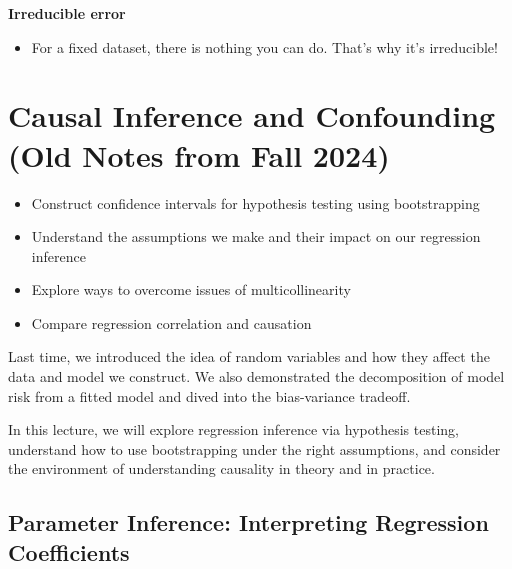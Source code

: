\documentclass[
  letterpaper,
  DIV=11,
  numbers=noendperiod]{scrreprt}
\providecommand{\tightlist}{%
  \setlength{\itemsep}{0pt}\setlength{\parskip}{0pt}}\usepackage{longtable,booktabs,array}
\begin{document}
\textbf{Irreducible error}

\begin{itemize}
\tightlist
\item
  For a fixed dataset, there is nothing you can do. That's why it's
  irreducible!
\end{itemize}


\chapter{Causal Inference and Confounding (Old Notes from Fall
2024)}\label{causal-inference-and-confounding-old-notes-from-fall-2024}

\begin{tcolorbox}[enhanced jigsaw, titlerule=0mm, bottomtitle=1mm, arc=.35mm, colframe=quarto-callout-note-color-frame, rightrule=.15mm, opacityback=0, opacitybacktitle=0.6, leftrule=.75mm, breakable, toprule=.15mm, colback=white, left=2mm, colbacktitle=quarto-callout-note-color!10!white, toptitle=1mm, bottomrule=.15mm, title=\textcolor{quarto-callout-note-color}{\faInfo}\hspace{0.5em}{Learning Outcomes}, coltitle=black]

\begin{itemize}
\tightlist
\item
  Construct confidence intervals for hypothesis testing using
  bootstrapping
\item
  Understand the assumptions we make and their impact on our regression
  inference
\item
  Explore ways to overcome issues of multicollinearity
\item
  Compare regression correlation and causation
\end{itemize}

\end{tcolorbox}

Last time, we introduced the idea of random variables and how they
affect the data and model we construct. We also demonstrated the
decomposition of model risk from a fitted model and dived into the
bias-variance tradeoff.

In this lecture, we will explore regression inference via hypothesis
testing, understand how to use bootstrapping under the right
assumptions, and consider the environment of understanding causality in
theory and in practice.

\section{Parameter Inference: Interpreting Regression
Coefficients}\label{parameter-inference-interpreting-regression-coefficients}
\end{document}
